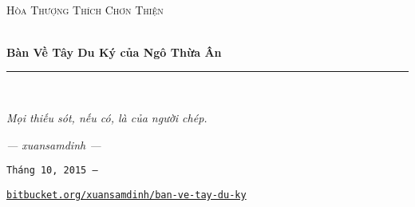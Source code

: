 \begin{titlepage}
\begin{center}
~\\
\textsc{Hòa Thượng Thích Chơn Thiện}
\vspace{3.5cm}

\HRule \\[0.5cm]
\textbf{\Huge{Bàn Về Tây Du Ký của Ngô Thừa Ân}}\\[0.5cm]
\rule{\linewidth}{0.5pt}\\[1cm]


\end{center}

\vfill
\hfill
\begin{minipage}{0.4\textwidth}
\begin{flushright}
\emph{Mọi thiếu sót, nếu có, là của người chép.}

\emph{--- xuansamdinh ---}

\texttt{Tháng 10, 2015 ---}
\end{flushright}
\end{minipage}

\begin{flushright}
\href{https://bitbucket.org/xuansamdinh/ban-ve-tay-du-ky}{\texttt{bitbucket.org/xuansamdinh/ban-ve-tay-du-ky}}
\end{flushright}
\end{titlepage}
